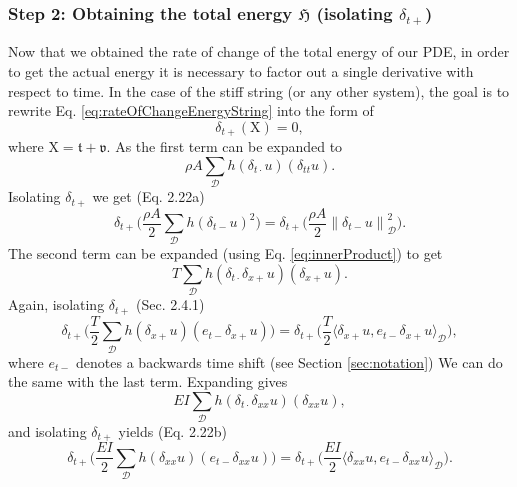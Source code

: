 \documentclass{article}
\begin{document}
\subsubsection*{Step 2: Obtaining the total energy $\mathfrak{H}$ (isolating $\delta_{t+}$)}
Now that we obtained the rate of change of the total energy of our PDE, in order to get the actual energy it is necessary to factor out a single derivative with respect to time.
 In the case of the stiff string (or any other system), the goal is to rewrite Eq. \eqref{eq:rateOfChangeEnergyString} into the form of
\begin{equation}\label{eq:forwardTimeForm}
    \delta_{t+}(\text{X}) = 0,
\end{equation}
where $\text{X}=\mathfrak{t} + \mathfrak{v}$.
As the first term can be expanded to
\begin{equation}
    \rho A\sum_\mathcal{D}h(\delta_{t\cdot}u)(\delta_{tt}u).
\end{equation}
Isolating $\delta_{t+}$ we get (Eq. 2.22a)
\begin{equation}
\delta_{t+}\Bigg(\frac{\rho A}{2}\sum_\mathcal{D}h(\delta_{t-}u)^2\Bigg) = \delta_{t+}\Bigg(\frac{\rho A}{2} \left\lVert\delta_{t-}u\right\rVert_\mathcal{D}^2\Bigg).
\end{equation}
The second term can be expanded (using Eq. \eqref{eq:innerProduct}) to get
\begin{equation}
    T \sum_{\mathcal{D}}h (\delta_{t\cdot}\delta_{x+}u)(\delta_{x+}u).
\end{equation}
Again, isolating $\delta_{t+}$ (Sec. 2.4.1)
\begin{equation}
    \delta_{t+}\Bigg(\frac{T}{2}\sum_\mathcal{D}h (\delta_{x+}u)( e_{t-}\delta_{x+}u)\Bigg) = \delta_{t+}\Bigg(\frac{T}{2}\langle\delta_{x+}u, e_{t-}\delta_{x+}u\rangle_\mathcal{D}\Bigg),
\end{equation}
where $e_{t-}$ denotes a backwards time shift (see Section \ref{sec:notation})
We can do the same with the last term. Expanding gives
\begin{equation}
    EI \sum_{\mathcal{D}}h(\delta_{t\cdot}\delta_{xx}u)(\delta_{xx}u),
\end{equation}
and isolating $\delta_{t+}$ yields (Eq. 2.22b)
\begin{equation}
    \delta_{t+}\Bigg(\frac{EI}{2}\sum_\mathcal{D}h(\delta_{xx}u)(e_{t-}\delta_{xx}u)\Bigg) = \delta_{t+}\Bigg(\frac{EI}{2}\langle\delta_{xx}u,e_{t-}\delta_{xx}u\rangle_\mathcal{D}\Bigg).
\end{equation}
\end{document}
